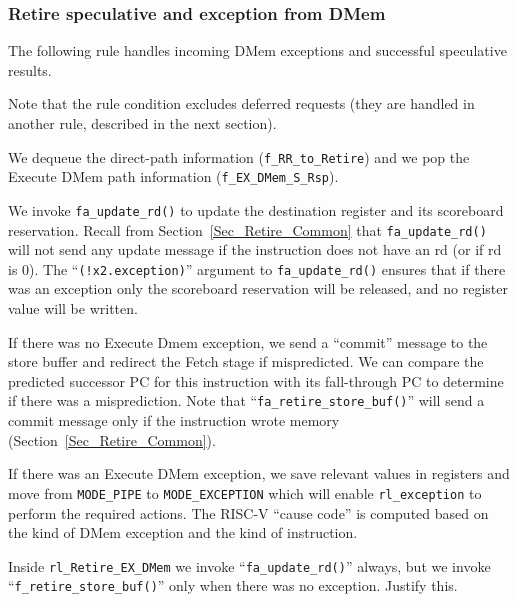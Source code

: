 
\subsubsection{Retire speculative and exception from DMem}

\label{Sec_Fife_Retire_DMem}

The following rule handles incoming DMem exceptions and successful
speculative results.



Note that the rule condition excludes deferred requests (they are
handled in another rule, described in the next section).

We dequeue the direct-path information (\verb|f_RR_to_Retire|) and we
pop the Execute DMem path information (\verb|f_EX_DMem_S_Rsp|).

We invoke \verb|fa_update_rd()| to update the destination register and
its scoreboard reservation.  Recall from
Section~\ref{Sec_Retire_Common} that \verb|fa_update_rd()| will not
send any update message if the instruction does not have an rd (or if
rd is 0).  The ``\verb|(!x2.exception)|'' argument to
\verb|fa_update_rd()| ensures that if there was an exception only the
scoreboard reservation will be released, and no register value will be
written.

If there was no Execute Dmem exception, we send a ``commit'' message
to the store buffer and redirect the Fetch stage if mispredicted.  We
can compare the predicted successor PC for this instruction with its
fall-through PC to determine if there was a misprediction.  Note that
``\verb|fa_retire_store_buf()|'' will send a commit message only if
the instruction wrote memory (Section~\ref{Sec_Retire_Common}).

If there was an Execute DMem exception, we save relevant values in
registers and move from \verb|MODE_PIPE| to \verb|MODE_EXCEPTION|
which will enable \verb|rl_exception| to perform the required actions.
The RISC-V ``cause code'' is computed based on the kind of DMem
exception and the kind of instruction.


\Exercise

Inside \verb|rl_Retire_EX_DMem| we invoke ``\verb|fa_update_rd()|''
always, but we invoke ``\verb|f_retire_store_buf()|'' only when there
was no exception.  Justify this.

